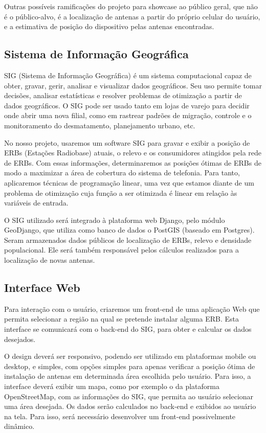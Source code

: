 \documentclass[12pt,a4paper]{article}
\begin{document}
Outras possíveis ramificações do projeto para showcase ao público geral, que não
é o público-alvo, é a localização de antenas a partir do próprio celular do
usuário, e a estimativa de posição do dispositivo pelas antenas encontradas.

\subsection{Sistema de Informação Geográfica}
SIG (Sistema de Informação Geográfica) é um sistema computacional capaz de
obter, gravar, gerir, analisar e visualizar dados geográficos. Seu uso permite
tomar decisões, analisar estatísticas e resolver problemas de otimização a
partir de dados geográficos. O SIG pode ser usado tanto em lojas de varejo para
decidir onde abrir uma nova filial, como em rastrear padrões de migração,
controle e o monitoramento do desmatamento, planejamento urbano, etc.

No nosso projeto, usaremos um software SIG para gravar e exibir a posição de
ERBs (Estações Radiobase) atuais, o relevo e os consumidores atingidos pela
rede de ERBs. Com essas informações, determinaremos as posições ótimas de
ERBs de modo a maximizar a área de cobertura do sistema de telefonia.
Para tanto, aplicaremos técnicas de programação linear, uma vez que
estamos diante de um problema de otimização cuja função a ser otimizada
é linear em relação às variáveis de entrada.

O SIG utilizado será integrado à plataforma web Django, pelo módulo GeoDjango,
que utiliza como banco de dados o PostGIS (baseado em Postgres). Seram armazenados
dados públicos de localização de ERBs, relevo e densidade populacional. Ele
será também responsável pelos cálculos realizados para a localização de novas
antenas.

\subsection{Interface Web}
Para interação com o usuário, criaremos um front-end de uma aplicação Web que
permita selecionar a região na qual se pretende instalar alguma ERB.
Esta interface se comunicará com o back-end do SIG, para obter e calcular os
dados desejados.

O design deverá ser responsivo, podendo ser utilizado em plataformas mobile
ou desktop, e simples, com opções simples para apenas verificar a posição ótima
de instalação de antenas em determinada área escolhida pelo usuário. Para isso,
a interface deverá exibir um mapa, como por exemplo o da plataforma
OpenStreetMap, com as informações do SIG, que permita ao usuário selecionar uma
área desejada. Os dados serão calculados no back-end e exibidos ao usuário na
tela. Para isso, será necessário desenvolver um front-end possivelmente
dinâmico.
\end{document}
